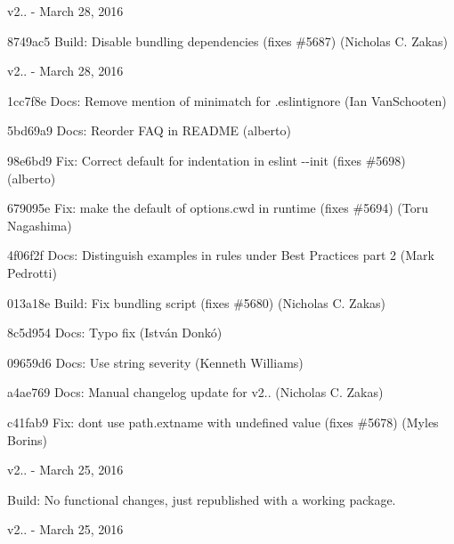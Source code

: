 v2.. -\/ March 28, 2016


\begin{DoxyItemize}
\item 8749ac5 Build\+: Disable bundling dependencies (fixes \#5687) (Nicholas C. Zakas)
\end{DoxyItemize}

v2.. -\/ March 28, 2016


\begin{DoxyItemize}
\item 1cc7f8e Docs\+: Remove mention of minimatch for .eslintignore (Ian Van\+Schooten)
\item 5bd69a9 Docs\+: Reorder F\+AQ in R\+E\+A\+D\+ME (alberto)
\item 98e6bd9 Fix\+: Correct default for indentation in {\ttfamily eslint -\/-\/init} (fixes \#5698) (alberto)
\item 679095e Fix\+: make the default of {\ttfamily options.\+cwd} in runtime (fixes \#5694) (Toru Nagashima)
\item 4f06f2f Docs\+: Distinguish examples in rules under Best Practices part 2 (Mark Pedrotti)
\item 013a18e Build\+: Fix bundling script (fixes \#5680) (Nicholas C. Zakas)
\item 8c5d954 Docs\+: Typo fix (István Donkó)
\item 09659d6 Docs\+: Use string severity (Kenneth Williams)
\item a4ae769 Docs\+: Manual changelog update for v2.. (Nicholas C. Zakas)
\item c41fab9 Fix\+: don\textquotesingle{}t use path.\+extname with undefined value (fixes \#5678) (Myles Borins)
\end{DoxyItemize}

v2.. -\/ March 25, 2016


\begin{DoxyItemize}
\item Build\+: No functional changes, just republished with a working package.
\end{DoxyItemize}

v2.. -\/ March 25, 2016


